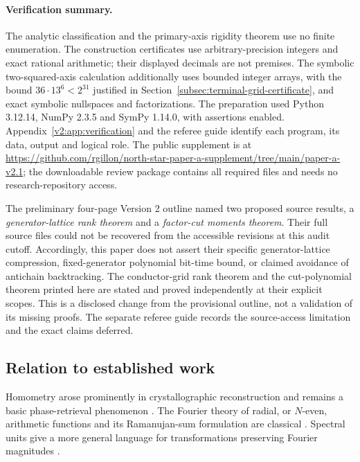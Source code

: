 \documentclass[11pt]{article}
\numberwithin{equation}{section}
\theoremstyle{definition}
\theoremstyle{remark}
\begin{document}
\paragraph{Verification summary.}
The analytic classification and the primary-axis rigidity theorem use no finite enumeration. The construction certificates use arbitrary-precision integers and exact rational arithmetic; their displayed decimals are not premises. The symbolic two-squared-axis calculation additionally uses bounded integer arrays, with the bound $36\cdot13^6<2^{31}$ justified in Section~\ref{subsec:terminal-grid-certificate}, and exact symbolic nullspaces and factorizations. The preparation used Python 3.12.14, NumPy 2.3.5 and SymPy 1.14.0, with assertions enabled. Appendix~\ref{v2:app:verification} and the referee guide identify each program, its data, output and logical role. The public supplement is at \url{https://github.com/rgillon/north-star-paper-a-supplement/tree/main/paper-a-v2.1}; the downloadable review package contains all required files and needs no research-repository access.

The preliminary four-page Version 2 outline named two proposed source results, a \emph{generator-lattice rank theorem} and a \emph{factor-cut moments theorem}. Their full source files could not be recovered from the accessible revisions at this audit cutoff. Accordingly, this paper does not assert their specific generator-lattice compression, fixed-generator polynomial bit-time bound, or claimed avoidance of antichain backtracking. The conductor-grid rank theorem and the cut-polynomial theorem printed here are stated and proved independently at their explicit scopes. This is a disclosed change from the provisional outline, not a validation of its missing proofs. The separate referee guide records the source-access limitation and the exact claims deferred.

\subsection{Relation to established work}
Homometry arose prominently in crystallographic reconstruction and remains a basic phase-retrieval phenomenon \cite{Patterson1944,RosenblattSeymour1982,BendoryEdidinGonzalez2023}. The Fourier theory of radial, or $N$-even, arithmetic functions and its Ramanujan-sum formulation are classical \cite{TothHaukkanen2011}. Spectral units give a more general language for transformations preserving Fourier magnitudes \cite{Rosenblatt1984,Amiot2009}.
\end{document}
